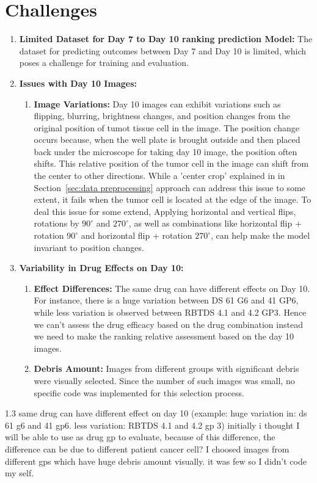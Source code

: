 \section{Challenges}
\begin{enumerate}
    \item \textbf{Limited Dataset for Day 7 to Day 10 ranking prediction Model:} The dataset for predicting outcomes between Day 7 and Day 10 is limited, which poses a challenge for training and evaluation.

    \item \textbf{Issues with Day 10 Images:}
    \begin{enumerate}
        \item \textbf{Image Variations:} Day 10 images can exhibit variations such as flipping, blurring, brightness changes, and position changes from the original position of tumot tissue 
        cell in the image. 
        The position change occurs because, when the well plate is brought outside and then placed back under the microscope for taking day 10 image, 
        the position often shifts. This relative position of the tumor cell in the image can shift from the center to other directions.
         While a 'center crop' explained in in Section~\ref{sec:data preprocessing} approach can address this issue to some extent, it fails when the tumor cell 
         is located at the edge of the image. To deal this issue for some extend, Applying horizontal and vertical flips, rotations by $90^\circ$ and $270^\circ$, as 
        well as combinations like horizontal flip + rotation $90^\circ$ and horizontal flip + rotation $270^\circ$, can help make the model invariant to position changes.
    \end{enumerate}

    \item \textbf{Variability in Drug Effects on Day 10:}
    \begin{enumerate}
        \item \textbf{Effect Differences:} The same drug can have different effects on Day 10. For instance, there is a huge variation between DS 61 G6 and 
        41 GP6, while less variation is observed between RBTDS 4.1 and 4.2 GP3. Hence we can't assess the drug efficacy based on the drug combination instead we need to make the ranking relative 
        assessment based on the day 10 images.
        \item \textbf{Debris Amount:} Images from different groups with significant debris were visually selected. Since the number of such images was small, no specific code was implemented for this selection process.
    \end{enumerate}
\end{enumerate}


 

1.3 same drug can have different effect on day 10 (example: huge variation in: ds 61 g6 and 41 gp6. less variation: 
RBTDS 4.1 and 4.2 gp 3) initially i thought I will be able to use 
as drug gp to evaluate, because of this difference, the difference can be due to different patient cancer cell?
I choosed images from different gps which have huge debris amount visually. it was few so I didn't code my self.
